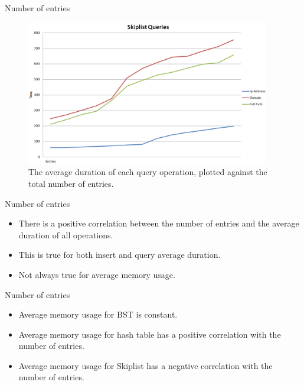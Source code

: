\documentclass[10pt]{beamer}
\begin{document}
\begin{frame}{Number of entries}
    \begin{figure}
      \centering
        \includegraphics[width=0.95\textwidth]{SkiplistQuery}
      \caption{The average duration of each query operation, plotted against the total number of entries.}
    \end{figure}
\end{frame}

\begin{frame}{Number of entries}
    \begin{itemize}
        \item There is a positive correlation between the number of entries and the average duration of all operations.
        \item This is true for both insert and query average duration.
        \item Not always true for average memory usage.
    \end{itemize}
\end{frame}

\begin{frame}{Number of entries}
    \begin{itemize}
        \item Average memory usage for BST is constant.
        \item Average memory usage for hash table has a positive correlation with the number of entries.
        \item Average memory usage for Skiplist has a negative correlation with the number of entries.
    \end{itemize}
\end{frame}
\end{document}

